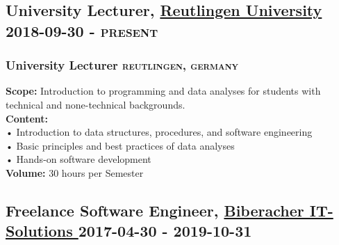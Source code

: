 \documentclass{article}
\newcommand{\rside}[1]{\hfill \normalfont\scshape\MakeLowercase{#1}}
\begin{document}
\subsection{ University Lecturer, \href{ https://www.linkedin.com/company/reutlingen-university/ }{ Reutlingen University } \rside{ 2018-09-30 - PRESENT } }
\subsubsection{ University Lecturer \rside{ Reutlingen, Germany } }
\begin{flushleft}
\textbf{Scope:} Introduction to programming and data analyses for students with technical and none-technical backgrounds.\\[1em]\textbf{Content:}\\• Introduction to data structures, procedures, and software engineering\\• Basic principles and best practices of data analyses \\• Hands-on software development\\[1em]\textbf{Volume:} 30 hours per Semester
\end{flushleft}

\subsection{ Freelance Software Engineer, \href{  }{ Biberacher IT-Solutions } \rside{ 2017-04-30 - 2019-10-31 } }
\end{document}
